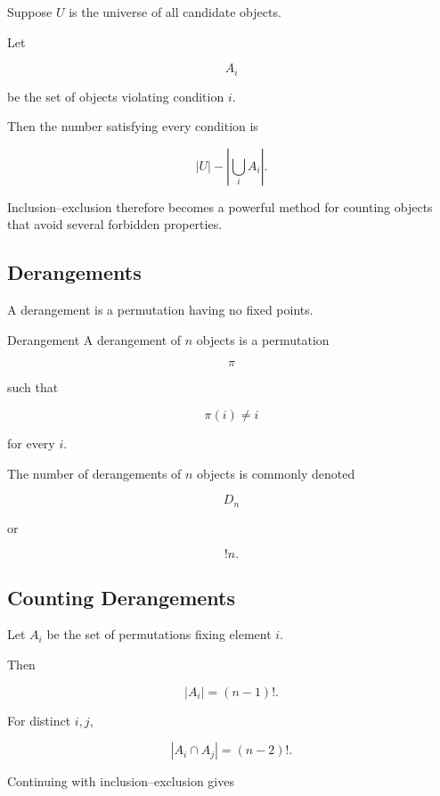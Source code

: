 Suppose \(U\) is the universe of all candidate objects.

Let

\[
A_i
\]

be the set of objects violating condition \(i\).

Then the number satisfying every condition is

\[
\boxed{
|U|
-
\left|
\bigcup_iA_i
\right|.
}
\]

Inclusion--exclusion therefore becomes a powerful method for counting
objects that avoid several forbidden properties.

\subsection{Derangements}
\label{subsec:derangements}

A derangement is a permutation having no fixed points.

\begin{definitionbox}{Derangement}
A derangement of \(n\) objects is a permutation

\[
\pi
\]

such that

\[
\boxed{
\pi(i)\neq i
}
\]

for every \(i\).
\end{definitionbox}

The number of derangements of \(n\) objects is commonly denoted

\[
D_n
\]

or

\[
!n.
\]

\subsection{Counting Derangements}
\label{subsec:counting-derangements}

Let \(A_i\) be the set of permutations fixing element \(i\).

Then

\[
|A_i|=(n-1)!.
\]

For distinct \(i,j\),

\[
|A_i\cap A_j|=(n-2)!.
\]

Continuing with inclusion--exclusion gives

